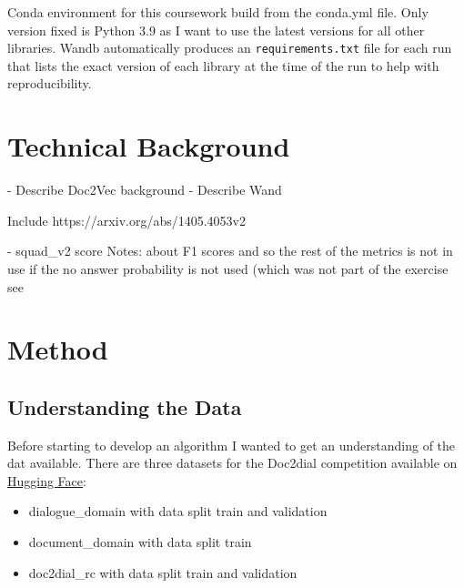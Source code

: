 \documentclass[11pt]{article}
\begin{document}
    Conda environment for this coursework build from the conda.yml file. Only version fixed is Python 3.9 as I want
    to use the latest versions for all other libraries. Wandb \cite{wandb} automatically produces an \texttt{requirements.txt}
    file for each run that lists the exact version of each library at the time of the run to help with reproducibility.


    \section{Technical Background}\label{sec:technical-background}

    - Describe Doc2Vec background
    - Describe Wand

    Include https://arxiv.org/abs/1405.4053v2

    - squad\_v2 score Notes: about F1 scores and so the rest of the metrics is not in use if the no answer probability is not used (which was not part of the exercise
    see \cite{squad2git}


    \section{Method}\label{sec:method}

    \subsection{Understanding the Data}\label{subsec:understanding-the-data-method}
    Before starting to develop an algorithm I wanted to get an understanding of the dat available.
    There are three datasets for the Doc2dial competition available on \href{https://huggingface.co/datasets/doc2dial}{Hugging Face}:
    \begin{itemize}
        \item dialogue\_domain with data split train and validation
        \item document\_domain with data split train
        \item doc2dial\_rc with data split train and validation
    \end{itemize}
\end{document}
